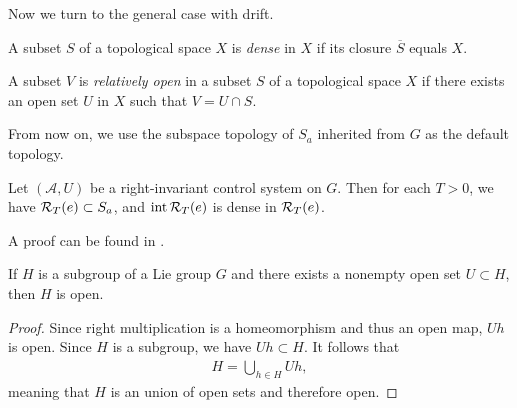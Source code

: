 \documentclass[12pt,class=article,crop=false]{standalone}
\begin{document}
Now we turn to the general case with drift.
\begin{defn}
A subset $ S$ of a topological space $ X$ is \emph{dense}  in  $ X$ if its closure $ \overline{S}$ equals $X$.
\end{defn}
\begin{defn}
A subset $ V$ is \emph{relatively open}  in a subset $ S $  of a topological space $ X$ if there exists an open set $ U$ in  $ X$ such that $ V = U \cap S$.
\end{defn}

From now on, we use the subspace topology of $ S_a$ inherited from $ G$ as the default topology.
\begin{fact} \label{fact:dense_int} 
Let $ (\mathcal{A},U)$ be a right-invariant control system on $G$. Then for each $ T>0$, we have $ \mathcal{R}_T( e) \subset S_a$, and $ \operatorname{int} \mathcal{R}_T( e) $ is dense in $ \mathcal{R}_T( e) $.
\end{fact}
A proof can be found in \cite{TODO}. 
\begin{lemma} \label{lem:subgroup_open} 
If $ H$ is a subgroup of a Lie group $ G$ and there exists a nonempty open set $U \subset H$, then $ H$ is open.
\end{lemma}
\begin{proof}
Since right multiplication is a homeomorphism and thus an open map, $ Uh$ is open. Since  $ H$ is a subgroup, we have $ Uh \subset H$. It follows that
 \begin{align*}
	H = \bigcup_{ h \in H} Uh ,
\end{align*}
meaning that $ H$ is an union of open sets and therefore open.
\end{proof}
\end{document}
